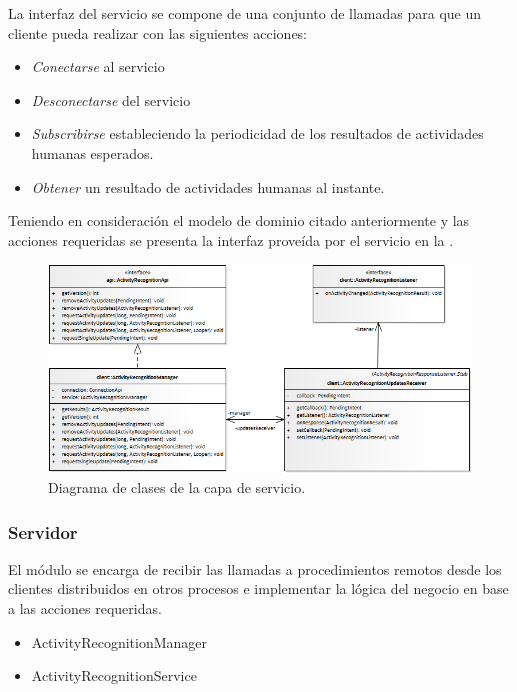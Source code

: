 La interfaz del servicio se compone de una conjunto de llamadas para
que un cliente pueda realizar con las siguientes acciones:
\begin{itemize}
\item \emph{Conectarse} al servicio
\item \emph{Desconectarse} del servicio
\item \emph{Subscribirse} estableciendo la periodicidad de los resultados
de actividades humanas esperados. 
\item \emph{Obtener} un resultado de actividades humanas al instante.
\end{itemize}
Teniendo en consideración el modelo de dominio citado anteriormente
y las acciones requeridas se presenta la interfaz proveída por el
servicio en la .

\begin{figure}
\begin{centering}
\includegraphics[width=0.8\columnwidth]{capitulo-5/graphics/class_service}
\par\end{centering}
\caption[Diagrama de clases de la capa de servicio]{\label{fig5:service}Diagrama de clases de la capa de servicio.}

\end{figure}


\subsubsection{Servidor}

El módulo se encarga de recibir las llamadas a procedimientos remotos
desde los clientes distribuidos en otros procesos e implementar la
lógica del negocio en base a las acciones requeridas. 
\begin{itemize}
\item ActivityRecognitionManager
\item ActivityRecognitionService
\end{itemize}

